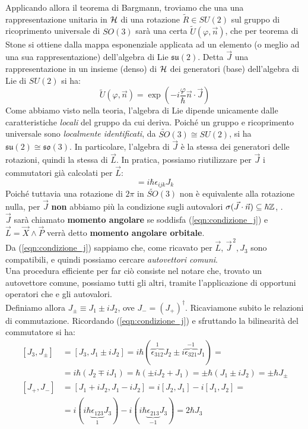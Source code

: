 \documentclass[../../FisicaTeorica.tex]{subfiles}
\begin{document}
Applicando allora il teorema di Bargmann, troviamo che una una rappresentazione unitaria in $\mathcal{H}$ di una rotazione $\tilde{R} \in SU(2)$ sul gruppo di ricoprimento universale di $SO(3)$ sarà una certa $\tilde{U}(\varphi,\vec{n})$, che per teorema di Stone si ottiene dalla mappa esponenziale applicata ad un elemento (o meglio ad una sua rappresentazione) dell'algebra di Lie $\mathfrak{su}(2)$. Detta $\vec{J}$ una rappresentazione in un insieme (denso) di $\mathcal{H}$ dei generatori (base) dell'algebra di Lie di $SU(2)$ si ha:
\[
\tilde{U}(\varphi,\vec{n}) = \exp\left(-i\frac{\varphi}{\hbar}\vec{n}\cdot \vec{J}\right)
\]
Come abbiamo visto nella teoria, l'algebra di Lie dipende unicamente dalle caratteristiche \textit{locali} del gruppo da cui deriva. Poiché un gruppo e ricoprimento universale sono \textit{localmente identificati}, da $\tilde{SO}(3) \cong SU(2)$, si ha $\mathfrak{su}(2) \cong \mathfrak{so}(3)$. In particolare, l'algebra di $\vec{J}$ è la stessa dei generatori delle rotazioni, quindi la stessa di $\vec{L}$. In pratica, possiamo riutilizzare per $\vec{J}$ i commutatori già calcolati per $\vec{L}$:
\begin{equation}
[J_i, J_j] = i\hbar \epsilon_{ijk}J_k
\label{eqn:condizione_j}
\end{equation}
Poiché tuttavia una rotazione di $2\pi$ in $\tilde{SO}(3)$ non è equivalente alla rotazione nulla, per $\vec{J}$ \textbf{non} abbiamo più la condizione sugli autovalori  $\sigma(\vec{J}\cdot \vec{n}) \subseteq \hbar \mathbb{Z}$, .\\
$\vec{J}$ sarà chiamato \textbf{momento angolare} se soddisfa (\ref{eqn:condizione_j}) e $\vec{L}=\vec{X}\land \vec{P}$ verrà detto \textbf{momento angolare orbitale}.\\

Da (\ref{eqn:condizione_j}) sappiamo che, come ricavato per $\vec{L}$, $\vec{J}^{\,2}, J_3$ sono compatibili, e quindi possiamo cercare \textit{autovettori comuni}.\\
Una procedura efficiente per far ciò consiste nel notare che, trovato un autovettore comune, possiamo  tutti gli altri, tramite l'applicazione di opportuni operatori che  e  gli autovalori.\\

Definiamo allora $J_{\pm} \equiv J_1 \pm i J_2$, ove $J_- = (J_+)^\dag$. Ricaviamone subito le relazioni di commutazione. Ricordando (\ref{eqn:condizione_j}) e sfruttando la bilinearità del commutatore si ha:
\begin{align}\nonumber
[J_3, J_{\pm}] &= [J_3, J_1 \pm i J_2] = i\hbar (\overbrace{\epsilon_{312}}^{1} J_2 \pm i\overbrace{ \epsilon_{321}}^{-1}J_1) =\\
&=i\hbar (J_2 \mp iJ_1) = \hbar (\pm i J_2 + J_1) = \pm \hbar(J_1 \pm i J_2) = \pm \hbar J_\pm
\label{eqn:commutazione_Jpm}
\\
[J_+, J_-] &= [J_1 + iJ_2, J_1 - iJ_2]=i[J_2, J_1]-i[J_1,J_2]=\\
&= i(i\hbar\underbrace{\epsilon_{123}}_{1}J_3) -i(i\hbar\underbrace{ \epsilon_{213}}_{-1}J_3)=
2\hbar J_3 \nonumber
\end{align}
\end{document}
